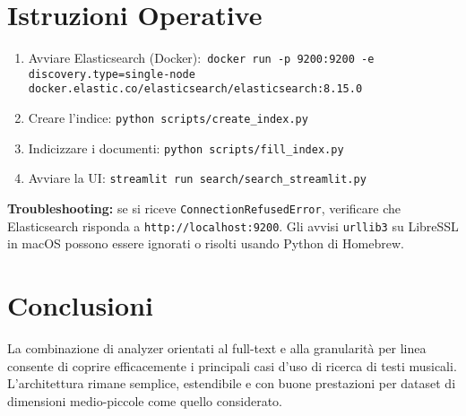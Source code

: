 \documentclass[a4paper,11pt]{article}
\begin{document}
\section{Istruzioni Operative}
\begin{enumerate}[nosep]
  \item Avviare Elasticsearch (Docker):\ \texttt{docker run -p 9200:9200 -e discovery.type=single-node docker.elastic.co/elasticsearch/elasticsearch:8.15.0}
  \item Creare l'indice: \texttt{python scripts/create\_index.py}
  \item Indicizzare i documenti: \texttt{python scripts/fill\_index.py}
  \item Avviare la UI: \texttt{streamlit run search/search\_streamlit.py}
\end{enumerate}
\noindent\textbf{Troubleshooting:} se si riceve \texttt{ConnectionRefusedError}, verificare che Elasticsearch risponda a \texttt{http://localhost:9200}. Gli avvisi \texttt{urllib3} su LibreSSL in macOS possono essere ignorati o risolti usando Python di Homebrew.

\section{Conclusioni}
La combinazione di analyzer orientati al full-text e alla granularità per linea consente di coprire efficacemente i principali casi d'uso di ricerca di testi musicali. L'architettura rimane semplice, estendibile e con buone prestazioni per dataset di dimensioni medio-piccole come quello considerato.
\end{document}
